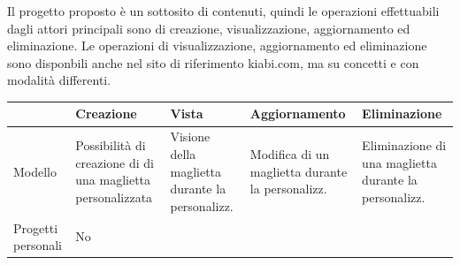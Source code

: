 \documentclass[12pt,italian,]{report}
\begin{document}
Il progetto proposto è un sottosito di contenuti, quindi le operazioni effettuabili dagli attori principali sono di creazione, visualizzazione, aggiornamento ed eliminazione. Le operazioni di visualizzazione, aggiornamento ed eliminazione sono disponbili anche nel sito di riferimento kiabi.com, ma su concetti e con modalità differenti.

\begin{longtable}[]{@{}lllll@{}}
\toprule
\begin{minipage}[b]{0.17\columnwidth}\raggedright
\strut
\end{minipage} & \begin{minipage}[b]{0.17\columnwidth}\raggedright
Creazione\strut
\end{minipage} & \begin{minipage}[b]{0.17\columnwidth}\raggedright
Vista\strut
\end{minipage} & \begin{minipage}[b]{0.17\columnwidth}\raggedright
Aggiornamento\strut
\end{minipage} & \begin{minipage}[b]{0.17\columnwidth}\raggedright
Eliminazione\strut
\end{minipage}\tabularnewline
\midrule
\endhead
\begin{minipage}[t]{0.17\columnwidth}\raggedright
Modello\strut
\end{minipage} & \begin{minipage}[t]{0.17\columnwidth}\raggedright
Possibilità di creazione di di una maglietta personalizzata\strut
\end{minipage} & \begin{minipage}[t]{0.17\columnwidth}\raggedright
Visione della maglietta durante la personalizz.\strut
\end{minipage} & \begin{minipage}[t]{0.17\columnwidth}\raggedright
Modifica di un maglietta durante la personalizz.\strut
\end{minipage} & \begin{minipage}[t]{0.17\columnwidth}\raggedright
Eliminazione di una maglietta durante la personalizz.\strut
\end{minipage}\tabularnewline
\begin{minipage}[t]{0.17\columnwidth}\raggedright
Progetti personali\strut
\end{minipage} & \begin{minipage}[t]{0.17\columnwidth}\raggedright
No\strut
\end{minipage} & \begin{minipage}[t]{0.17\columnwidth}\raggedright

\end{minipage}
\end{longtable}
\end{document}
